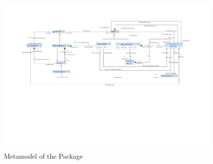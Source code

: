 %
%


\begin{figure}[htbp]
  \centering
  \includegraphics[width=\textheight,angle=90]{figures/A_technical-reference/packages/storydiagrams_calls_expressions/storydiagrams-calls-expressions}
  \caption{Metamodel of the  Package}
  \label{fig:MM:calls:expressions}
\end{figure}